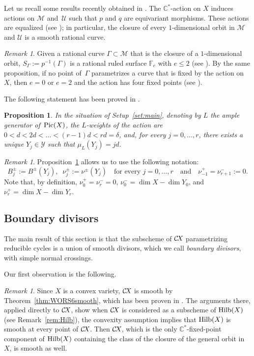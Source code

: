 \documentclass[10pt,a4paper]{article}
\numberwithin{equation}{section}
\newtheorem{proposition}[theorem]{Proposition}
\theoremstyle{definition}
\theoremstyle{remark}
\newtheorem{remark}[theorem]{Remark}
\newcommand\FF{{\mathbb{F}}}
\def\C{{\mathbb C}}
\def\cM{{\mathcal M}}
\def\cU{{\mathcal U}}
\def\cY{{\mathcal Y}}
\def\operatorname#1{\mathop{\rm #1}\nolimits}
\def\Hilb{\operatorname{Hilb}}
\def\Pic{\operatorname{Pic}}
\def\CX{\mathcal{C}\!X\hspace{-0.5pt}}
\begin{document}
Let us recall some results recently obtained in \cite{OS2}. 
The $\C^*$-action on $X$ induces actions on $\cM$ and~$\cU$ such that $p$ and $q$ are equivariant morphisms. These actions are equalized (see \cite[Propositions 4.5 and 4.8]{OS2}); in particular, the closure of every  $1$-dimensional orbit in $\cM$ and $\cU$ is a smooth rational curve.

\begin{remark}\label{rem:f2}
Given a rational curve $\Gamma \subset \cM$ that is the closure of a $1$-dimensional orbit, $S_\Gamma:=p^{-1}(\Gamma)$ is a rational ruled surface $\FF_e$ with $e \le 2$ (see \cite[Proposition 4.6]{OS2}). By the same proposition, if no point of~$\Gamma$ parametrizes a curve that is fixed by the action on $X$, then $e=0$ or $e=2$ and the action has four fixed points (see \cite[Figure 4.1]{OS2}).
\end{remark}
 
 The following statement has been proved in \cite[Theorem 5.3]{OS2}.
 
 \begin{proposition}\label{prop:onecomp}
 In the situation of Setup~\ref{set:main}, denoting by $L$ the ample generator of\, $\Pic(X)$, the $L$-weights of the action are $0 < d < 2d < \dots < (r-1)d < rd = \delta$, and, for every $j =0, \dots, r$, there exists a unique $Y_j \in \cY$ such that $\mu_L(Y_j)=jd$.
\end{proposition}

\begin{remark}\label{rem:convex} 
 Proposition~\ref{prop:onecomp} allows us to use the following notation:
  \[
  B_j^\pm:=B^\pm(Y_j),\;\; \nu^\pm_j:=\nu^\pm(Y_j)\quad\mbox{for every $j=0, \dots, r$}\quad \mbox{and}\quad \nu^+_{-1}=\nu^-_{r+1}:=0.\] Note that, by definition, $\nu^+_0=\nu^-_r=0$, $\nu^-_0=\dim X-\dim Y_0$, and $\nu^+_r=\dim X-\dim Y_r$.
\end{remark}

\subsection{Boundary divisors}\label{ssec:boundary}


The main result of this section is that the subscheme of $\CX$ parametrizing reducible cycles is a union of smooth divisors, which we call {\em boundary divisors}, with simple normal crossings. 

Our first observation is the following. 

\begin{remark}\label{rem:Hilb2}
Since $X$ is a convex variety, $\CX$  is smooth by Theorem~\ref{thm:WORS6smooth}, which has been proven in \cite[Proposition~6.4]{WORS6}. The arguments there, applied directly to $\CX$, show when $\CX$ is considered as a subscheme of $\Hilb(X)$ (see Remark~\ref{rem:Hilb}), the convexity assumption implies that $\Hilb(X)$ is smooth at every point of $\CX$. Then $\CX$, which is the only $\C^*$-fixed-point component of $\Hilb(X)$ containing the class of the closure of the general orbit in $X$, is smooth as well.
\end{remark}
\end{document}
